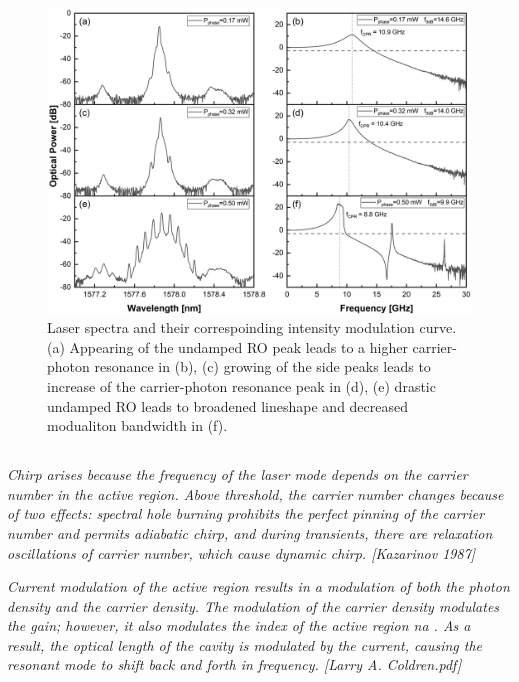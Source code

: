 \begin{figure}[ht]
    \centering
    \includegraphics[width=\linewidth]{figures/Umdamped_RO_and_bandwidth_grating_4621.png}
    \caption{Laser spectra and their correspoinding intensity modulation curve. (a) Appearing of the undamped RO peak leads to a higher carrier-photon resonance in (b), (c) growing of the side peaks leads to increase of the carrier-photon resonance peak in (d), (e) drastic undamped RO leads to broadened lineshape and decreased modualiton bandwidth in (f).}
    \label{fig:undamped_RO}
\end{figure}

\subsection{}
\textit{Chirp arises because the frequency of the laser mode depends on the carrier number in the active region. Above threshold, the carrier number changes because of two effects: spectral hole burning prohibits the perfect pinning of the carrier number and permits adiabatic chirp, and during transients, there are relaxation oscillations of carrier number, which cause dynamic chirp. [Kazarinov 1987]}

\textit{Current modulation of the active region results in a modulation of both the photon density and the carrier density. The modulation of the carrier density modulates the gain; however, it also modulates the index of the active region na . As a result, the optical length of the cavity is modulated by the current, causing the resonant mode to shift back and forth in frequency. [Larry A. Coldren.pdf]}

